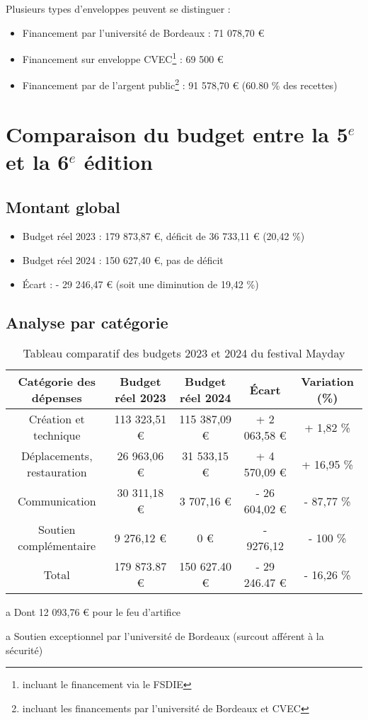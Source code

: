 \documentclass[12pt,a4paper]{report}
\begin{document}
Plusieurs types d'enveloppes peuvent se distinguer : 
\begin{itemize}
\item Financement par l'université de Bordeaux : 71 078,70 €
\item Financement sur enveloppe CVEC\footnote{incluant le financement via le FSDIE} : 69 500 €
\item Financement par de l'argent public\footnote{incluant les financements par l'université de Bordeaux et CVEC} : 91 578,70 € (60.80 \% des recettes)
\end{itemize}

\section{Comparaison du budget entre la 5$^e$ et la 6$^e$ édition}
\subsection{Montant global}
\begin{itemize}
\item Budget réel 2023 : 179 873,87 €, déficit de 36 733,11 € (20,42 \%)
\item Budget réel 2024 : 150 627,40 €, pas de déficit
\item Écart : - 29 246,47 € (soit une diminution de 19,42 \%)
\end{itemize}

\subsection{Analyse par catégorie}
\begin{center}
\begin{table}[h!]
\begin{threeparttable}
\begin{tabular}{|c|c|c|c|c|}
\hline
Catégorie des dépenses & Budget réel 2023 & Budget réel 2024 & Écart & Variation (\%) \\
\hline
Création et technique & 113 323,51 € & 115 387,09 € & + 2 063,58 € & + 1,82 \% \\
Déplacements, restauration & 26 963,06 € & 31 533,15 € & + 4 570,09 € & + 16,95 \% \\
Communication & 30 311,18 €\tnote{a} & 3 707,16 € & - 26 604,02 € & - 87,77 \% \\
Soutien complémentaire\tnote{b} & 9 276,12 € & 0 € & - 9276,12 & - 100 \%\\
\hline
Total & 179 873.87 € & 150 627.40 € & - 29 246.47 € & - 16,26 \%\\
\hline
\end{tabular}
\caption{Tableau comparatif des budgets 2023 et 2024 du festival Mayday}
\begin{tablenotes}
   \item[a] Dont 12 093,76 € pour le feu d'artifice
   \item[a] Soutien exceptionnel par l'université de Bordeaux (surcout afférent à la sécurité)
\end{tablenotes}
\end{threeparttable}
\end{table}
\end{center}
\end{document}
